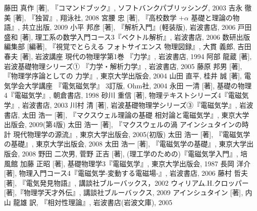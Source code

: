 ﻿%
\begin{thebibliography}{99}
   藤田 真作 [著], 『\LaTeXe コマンドブック』, ソフトバンクパブリッシング, 2003
   吉永 徹美 [著], 『独習\LaTeXe』, 翔泳社, 2008
     宮腰 忠 [著], 『高校数学 $+\alpha$ \small{基礎と理論の物語}』, 共立出版, 2009
     小平 邦彦 [著], 『解析入門』(軽装版), 岩波書店, 2006
     戸田 盛和 [著], 理工系の数学入門コース3『ベクトル解析』, 岩波書店, 2006
      数研出版編集部 [編著], 『視覚でとらえる フォトサイエンス 物理図録』,
    大貫 義郎, 吉田 春夫 [著], 岩波講座 現代の物理学第1巻 『力学』, 岩波書店, 1994
    阿部 龍蔵 [著], 岩波基礎物理シリーズ① 『力学・解析力学』, 岩波書店, 2005
    藤原 邦男 [著], 『物理学序論としての 力学』, 東京大学出版会, 2004
      山田 直平, 桂井 誠 [著], 電気学会大学講座 『電気磁気学』 3訂版, Ohm社, 2004
      永田 一清 [著], 基礎の物理4『電磁気学』, 朝倉書店, 1998
      砂川 重信 [著], 物理テキストシリーズ4『電磁気学』, 岩波書店, 2003
      川村 清 [著], 岩波基礎物理学シリーズ③『電磁気学』, 岩波書店,
      太田 浩一 [著], 『マクスウェル理論の基礎 \small{相対論と電磁気学}』, 東京大学出版会, 2009(第4版)
     太田 浩一 [著], 『マクスウェルの渦 アインシュタインの時計 \small{現代物理学の源流}』, 東京大学出版会, 2005(初版)
      太田 浩一 [著], 『電磁気学の基礎\I』, 東京大学出版会, 2008
      太田 浩一 [著], 『電磁気学の基礎\II』, 東京大学出版会, 2008
      野田 二次男, 菅野 正吉 [著], (理工学のための)『電磁気学入門』, 培風館
      加藤 正昭 [著], 基礎物理学3『電磁気学』, 東京大学出版会, 1987
     長岡 洋介 [著], 物理入門コース4『電磁気学\II ‐変動する電磁場‐』, 岩波書店, 2006
     藤村 哲夫 [著], 『電気発見物語』, 講談社ブルーバックス，2002
     ウィリアム.H.クロッパー [著],『物理学天才外伝』, 講談社ブルーバックス, 2009
     アインシュタイン [著], 内山 龍雄 訳, 『相対性理論』, 岩波書店(岩波文庫), 2005

\end{thebibliography}

